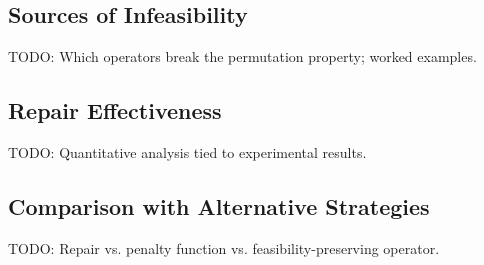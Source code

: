 %

\subsection{Sources of Infeasibility}
TODO: Which operators break the permutation property; worked examples.

\subsection{Repair Effectiveness}
TODO: Quantitative analysis tied to experimental results.

\subsection{Comparison with Alternative Strategies}
TODO: Repair vs. penalty function vs. feasibility-preserving operator.

